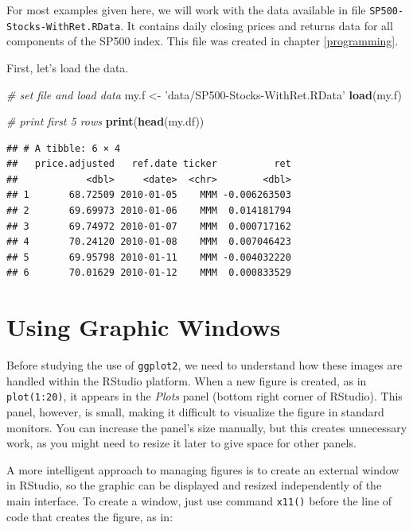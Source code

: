 \documentclass[11pt,]{book}
\newenvironment{Shaded}{\begin{snugshade}}{\end{snugshade}}
\newcommand{\KeywordTok}[1]{\textcolor[rgb]{0.27,0.27,0.27}{\textbf{#1}}}
\newcommand{\StringTok}[1]{\textcolor[rgb]{0.5,0.5,0.5}{#1}}
\newcommand{\CommentTok}[1]{\textcolor[rgb]{0.56,0.35,0.01}{\textit{#1}}}
\newcommand{\NormalTok}[1]{#1}
\begin{document}
For most examples given here, we will work with the data available in
file \texttt{SP500-Stocks-WithRet.RData}. It contains daily closing
prices and returns data for all components of the SP500 index. This file
was created in chapter \ref{programming}.

First, let's load the data.

\begin{Shaded}
\begin{Highlighting}[]
\CommentTok{# set file and load data}
\NormalTok{my.f <-}\StringTok{ 'data/SP500-Stocks-WithRet.RData'}
\KeywordTok{load}\NormalTok{(my.f)}

\CommentTok{# print first 5 rows}
\KeywordTok{print}\NormalTok{(}\KeywordTok{head}\NormalTok{(my.df))}
\end{Highlighting}
\end{Shaded}

\begin{verbatim}
## # A tibble: 6 × 4
##   price.adjusted   ref.date ticker          ret
##            <dbl>     <date>  <chr>        <dbl>
## 1       68.72509 2010-01-05    MMM -0.006263503
## 2       69.69973 2010-01-06    MMM  0.014181794
## 3       69.74972 2010-01-07    MMM  0.000717162
## 4       70.24120 2010-01-08    MMM  0.007046423
## 5       69.95798 2010-01-11    MMM -0.004032220
## 6       70.01629 2010-01-12    MMM  0.000833529
\end{verbatim}

\section{Using Graphic Windows}\label{using-graphic-windows}

Before studying the use of \texttt{ggplot2}, we need to understand how
these images are handled within the RStudio platform. When a new figure
is created, as in \texttt{plot(1:20)}, it appears in the \emph{Plots}
panel (bottom right corner of RStudio). This panel, however, is small,
making it difficult to visualize the figure in standard monitors. You
can increase the panel's size manually, but this creates unnecessary
work, as you might need to resize it later to give space for other
panels.

A more intelligent approach to managing figures is to create an external
window in RStudio, so the graphic can be displayed and resized
independently of the main interface. To create a window, just use
command \texttt{x11()} before the line of code that creates the figure,
as in: 
\end{document}
